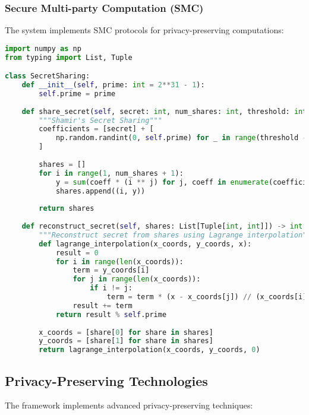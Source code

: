 \subsubsection{Secure Multi-party Computation (SMC)}
The system implements SMC protocols for privacy-preserving computations:

\begin{lstlisting}[language=python, caption=SMC Protocol Implementation]
import numpy as np
from typing import List, Tuple

class SecretSharing:
    def __init__(self, prime: int = 2**31 - 1):
        self.prime = prime
        
    def share_secret(self, secret: int, num_shares: int, threshold: int) -> List[Tuple[int, int]]:
        """Shamir's Secret Sharing"""
        coefficients = [secret] + [
            np.random.randint(0, self.prime) for _ in range(threshold - 1)
        ]
        
        shares = []
        for i in range(1, num_shares + 1):
            y = sum(coeff * (i ** j) for j, coeff in enumerate(coefficients)) % self.prime
            shares.append((i, y))
            
        return shares
        
    def reconstruct_secret(self, shares: List[Tuple[int, int]]) -> int:
        """Reconstruct secret from shares using Lagrange interpolation"""
        def lagrange_interpolation(x_coords, y_coords, x):
            result = 0
            for i in range(len(x_coords)):
                term = y_coords[i]
                for j in range(len(x_coords)):
                    if i != j:
                        term = term * (x - x_coords[j]) // (x_coords[i] - x_coords[j])
                result += term
            return result % self.prime
            
        x_coords = [share[0] for share in shares]
        y_coords = [share[1] for share in shares]
        return lagrange_interpolation(x_coords, y_coords, 0)
\end{lstlisting}

\subsection{Privacy-Preserving Technologies}

The framework implements advanced privacy-preserving techniques:

